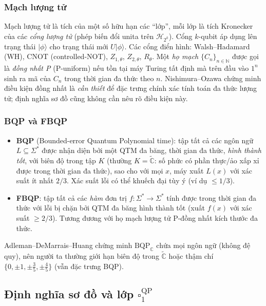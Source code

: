 \documentclass[10pt]{article}
\begin{document}
\subsubsection*{Mạch lượng tử}
Mạch lượng tử là tích của một số hữu hạn các ``lớp'', mỗi lớp là tích Kronecker của các \emph{cổng lượng tử} (phép biến đổi unita trên $\mathcal{H}_{2^k}$). Cổng $k$-qubit áp dụng lên trạng thái $|\phi\rangle$ cho trạng thái mới $U|\phi\rangle$. Các cổng điển hình: Walsh–Hadamard (WH), CNOT (controlled-NOT), $Z_{1,\theta}$, $Z_{2,\theta}$, $R_\theta$. Một \emph{họ mạch} $\{C_n\}_{n\in\mathbb{N}}$ được gọi là \emph{đồng nhất P} (P-uniform) nếu tồn tại máy Turing tất định mà trên đầu vào $1^n$ sinh ra mã của $C_n$ trong thời gian đa thức theo $n$. Nishimura–Ozawa chứng minh điều kiện đồng nhất là \emph{cần thiết} để đặc trưng chính xác tính toán đa thức lượng tử; định nghĩa sơ đồ cũng không cần nêu rõ điều kiện này.

\subsubsection*{BQP và FBQP}
\begin{itemize}[noitemsep]
  \item \textbf{BQP} (Bounded-error Quantum Polynomial time): tập tất cả các ngôn ngữ $L\subseteq\Sigma^*$ được nhận diện bởi một QTM đa băng, thời gian đa thức, \emph{hình thành tốt}, với biên độ trong tập $K$ (thường $K=\tilde{\mathbb{C}}$: số phức có phần thực/ảo xấp xỉ được trong thời gian đa thức), sao cho với mọi $x$, máy xuất $L(x)$ với xác suất ít nhất $2/3$. Xác suất lỗi có thể khuếch đại tùy ý (ví dụ $\le 1/3$).
  \item \textbf{FBQP}: tập tất cả các \emph{hàm} đơn trị $f:\Sigma^*\to\Sigma^*$ tính được trong thời gian đa thức với lỗi bị chặn bởi QTM đa băng hình thành tốt (xuất $f(x)$ với xác suất $\ge 2/3$). Tương đương với họ mạch lượng tử P-đồng nhất kích thước đa thức.
\end{itemize}
Adleman–DeMarrais–Huang chứng minh $\mathrm{BQP}_{\mathbb{C}}$ chứa mọi ngôn ngữ (không đệ quy), nên người ta thường giới hạn biên độ trong $\tilde{\mathbb{C}}$ hoặc thậm chí $\{0,\pm1,\pm\frac{3}{5},\pm\frac{4}{5}\}$ (vẫn đặc trưng BQP).

\subsection*{Định nghĩa sơ đồ và lớp $\square_1^{\mathrm{QP}}$}
\end{document}
